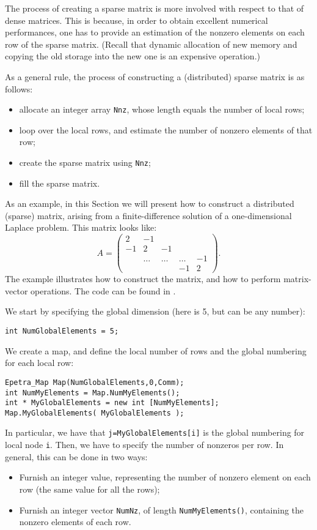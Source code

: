 The process of creating a sparse matrix is more involved with respect to
that of dense matrices. This is because, in order to obtain excellent
numerical performances, one has to provide an estimation of the nonzero
elements on each row of the sparse matrix. (Recall that dynamic
allocation of new memory and copying the old storage into the new one is
an expensive operation.) 

As a general rule, the process of constructing a (distributed) sparse
matrix is as follows:
\begin{itemize}
\item allocate an integer array \verb!Nnz!, whose length equals the
  number of local rows;
\item loop over the local rows, and estimate the number of nonzero
  elements of that row;
\item create the sparse matrix using \verb!Nnz!;
\item fill the sparse matrix.
\end{itemize}

As an example, in this Section we will present how to construct a
distributed (sparse) matrix, arising from a finite-difference solution
of a one-dimensional Laplace problem. This matrix looks like:
\begin{equation*}
A = \begin{pmatrix}
 2 & -1 &     &   &    \\
-1 &  2     & -1     &        &    \\
   & \ldots & \ldots & \ldots & -1 \\
   &        &        & -1     & 2
\end{pmatrix}.
\end{equation*}
The example illustrates how to construct the matrix,
and how to perform matrix-vector operations.
The code can be found in .

We start by specifying the global dimension (here is 5, but can be any
number):
\begin{verbatim}
int NumGlobalElements = 5;
\end{verbatim}
We create a map, and define the local number of rows and the
global numbering for each local row:
\begin{verbatim}
Epetra_Map Map(NumGlobalElements,0,Comm);
int NumMyElements = Map.NumMyElements();
int * MyGlobalElements = new int [NumMyElements];
Map.MyGlobalElements( MyGlobalElements );
\end{verbatim}
In particular, we have that \verb!j=MyGlobalElements[i]! is the global
numbering for local node \verb!i!.  Then, we have to specify the number
of nonzeros per row. In general, this can be done in two ways:
\begin{itemize}
\item Furnish an integer value, representing the number of nonzero
  element on each row (the same value for all the rows);
\item Furnish an integer vector \verb!NumNz!, of length
  \verb!NumMyElements()!, containing the nonzero elements of each row.
\end{itemize}

